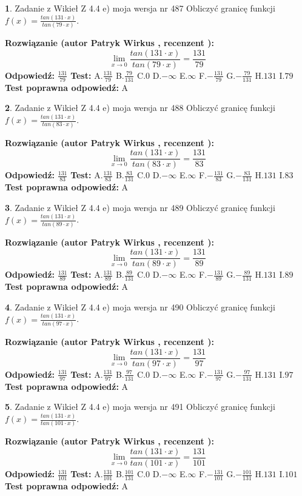 \documentclass[12pt, a4paper]{article}
\theoremstyle{definition} %
\newtheorem{zad}{}
\newcommand{\zadStart}[1]{\begin{zad}#1\newline}
\newcommand{\zadStop}{\end{zad}}
\newcommand{\rozwStart}[2]{\noindent \textbf{Rozwiązanie (autor #1 , recenzent #2): }\newline}
\newcommand{\rozwStop}{\newline}
\newcommand{\odpStart}{\noindent \textbf{Odpowiedź:}\newline}
\newcommand{\odpStop}{\newline}
\newcommand{\testStart}{\noindent \textbf{Test:}\newline}
\newcommand{\testStop}{\newline}
\newcommand{\kluczStart}{\noindent \textbf{Test poprawna odpowiedź:}\newline}
\newcommand{\kluczStop}{\newline}
\begin{document}
\zadStart{Zadanie z Wikieł Z 4.4 e) moja wersja nr 487}
Obliczyć granicę funkcji $f(x)=\frac{tan(131\cdot x)}{tan(79\cdot x)}$.
\zadStop
\rozwStart{Patryk Wirkus}{}
$$\lim\limits_{x\to 0}\frac{tan(131\cdot x)}{tan(79\cdot x)}=
\frac{131}{79}$$
\rozwStop
\odpStart
$\frac{131}{79}$
\odpStop
\testStart
A.$\frac{131}{79}$
B.$\frac{79}{131}$
C.$0$
D.$-\infty$
E.$\infty$
F.$-\frac{131}{79}$
G.$-\frac{79}{131}$
H.$131$
I.$79$
\testStop
\kluczStart
A
\kluczStop



\zadStart{Zadanie z Wikieł Z 4.4 e) moja wersja nr 488}
Obliczyć granicę funkcji $f(x)=\frac{tan(131\cdot x)}{tan(83\cdot x)}$.
\zadStop
\rozwStart{Patryk Wirkus}{}
$$\lim\limits_{x\to 0}\frac{tan(131\cdot x)}{tan(83\cdot x)}=
\frac{131}{83}$$
\rozwStop
\odpStart
$\frac{131}{83}$
\odpStop
\testStart
A.$\frac{131}{83}$
B.$\frac{83}{131}$
C.$0$
D.$-\infty$
E.$\infty$
F.$-\frac{131}{83}$
G.$-\frac{83}{131}$
H.$131$
I.$83$
\testStop
\kluczStart
A
\kluczStop



\zadStart{Zadanie z Wikieł Z 4.4 e) moja wersja nr 489}
Obliczyć granicę funkcji $f(x)=\frac{tan(131\cdot x)}{tan(89\cdot x)}$.
\zadStop
\rozwStart{Patryk Wirkus}{}
$$\lim\limits_{x\to 0}\frac{tan(131\cdot x)}{tan(89\cdot x)}=
\frac{131}{89}$$
\rozwStop
\odpStart
$\frac{131}{89}$
\odpStop
\testStart
A.$\frac{131}{89}$
B.$\frac{89}{131}$
C.$0$
D.$-\infty$
E.$\infty$
F.$-\frac{131}{89}$
G.$-\frac{89}{131}$
H.$131$
I.$89$
\testStop
\kluczStart
A
\kluczStop



\zadStart{Zadanie z Wikieł Z 4.4 e) moja wersja nr 490}
Obliczyć granicę funkcji $f(x)=\frac{tan(131\cdot x)}{tan(97\cdot x)}$.
\zadStop
\rozwStart{Patryk Wirkus}{}
$$\lim\limits_{x\to 0}\frac{tan(131\cdot x)}{tan(97\cdot x)}=
\frac{131}{97}$$
\rozwStop
\odpStart
$\frac{131}{97}$
\odpStop
\testStart
A.$\frac{131}{97}$
B.$\frac{97}{131}$
C.$0$
D.$-\infty$
E.$\infty$
F.$-\frac{131}{97}$
G.$-\frac{97}{131}$
H.$131$
I.$97$
\testStop
\kluczStart
A
\kluczStop



\zadStart{Zadanie z Wikieł Z 4.4 e) moja wersja nr 491}
Obliczyć granicę funkcji $f(x)=\frac{tan(131\cdot x)}{tan(101\cdot x)}$.
\zadStop
\rozwStart{Patryk Wirkus}{}
$$\lim\limits_{x\to 0}\frac{tan(131\cdot x)}{tan(101\cdot x)}=
\frac{131}{101}$$
\rozwStop
\odpStart
$\frac{131}{101}$
\odpStop
\testStart
A.$\frac{131}{101}$
B.$\frac{101}{131}$
C.$0$
D.$-\infty$
E.$\infty$
F.$-\frac{131}{101}$
G.$-\frac{101}{131}$
H.$131$
I.$101$
\testStop
\kluczStart
A
\kluczStop
\end{document}
